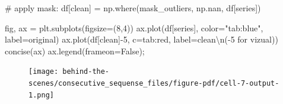 \documentclass[
  letterpaper,
  DIV=11,
  numbers=noendperiod,
  oneside]{scrreprt}
\newenvironment{Shaded}{\begin{snugshade}}{\end{snugshade}}
\newcommand{\CharTok}[1]{\textcolor[rgb]{0.13,0.47,0.30}{#1}}
\newcommand{\CommentTok}[1]{\textcolor[rgb]{0.37,0.37,0.37}{#1}}
\newcommand{\DecValTok}[1]{\textcolor[rgb]{0.68,0.00,0.00}{#1}}
\newcommand{\NormalTok}[1]{\textcolor[rgb]{0.00,0.23,0.31}{#1}}
\newcommand{\OperatorTok}[1]{\textcolor[rgb]{0.37,0.37,0.37}{#1}}
\newcommand{\StringTok}[1]{\textcolor[rgb]{0.13,0.47,0.30}{#1}}
\newcommand{\VariableTok}[1]{\textcolor[rgb]{0.07,0.07,0.07}{#1}}
\begin{document}
\begin{Shaded}
\begin{Highlighting}[]
\CommentTok{\# apply mask:}
\NormalTok{df[}\StringTok{\textquotesingle{}clean\textquotesingle{}}\NormalTok{] }\OperatorTok{=}\NormalTok{ np.where(mask\_outliers, np.nan, df[}\StringTok{\textquotesingle{}series\textquotesingle{}}\NormalTok{])}

\NormalTok{fig, ax }\OperatorTok{=}\NormalTok{ plt.subplots(figsize}\OperatorTok{=}\NormalTok{(}\DecValTok{8}\NormalTok{,}\DecValTok{4}\NormalTok{))}
\NormalTok{ax.plot(df[}\StringTok{\textquotesingle{}series\textquotesingle{}}\NormalTok{], color}\OperatorTok{=}\StringTok{"tab:blue"}\NormalTok{, label}\OperatorTok{=}\StringTok{\textquotesingle{}original\textquotesingle{}}\NormalTok{)}
\NormalTok{ax.plot(df[}\StringTok{\textquotesingle{}clean\textquotesingle{}}\NormalTok{]}\OperatorTok{{-}}\DecValTok{5}\NormalTok{, c}\OperatorTok{=}\StringTok{\textquotesingle{}tab:red\textquotesingle{}}\NormalTok{, label}\OperatorTok{=}\StringTok{\textquotesingle{}clean}\CharTok{\textbackslash{}n}\StringTok{({-}5 for vizual)\textquotesingle{}}\NormalTok{)}
\NormalTok{concise(ax)}
\NormalTok{ax.legend(frameon}\OperatorTok{=}\VariableTok{False}\NormalTok{)}\OperatorTok{;}
\end{Highlighting}
\end{Shaded}

\begin{figure}[H]

{\centering \texttt{[image: behind-the-scenes/consecutive\_sequense\_files/figure-pdf/cell-7-output-1.png]}

}

\end{figure}
\end{document}
